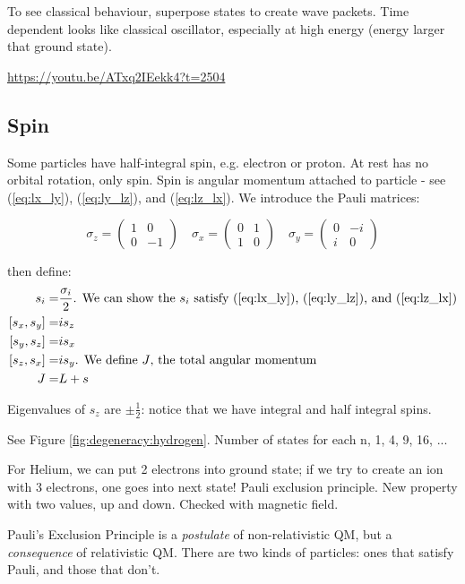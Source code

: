 \documentclass[]{article}
\begin{document}
To see classical behaviour, superpose states to create wave packets. Time dependent looks like classical oscillator, especially at high energy (energy larger that ground state).

\url{https://youtu.be/ATxq2IEekk4?t=2504}

\subsection{Spin}

Some particles have half-integral spin, e.g. electron or proton. At rest has no orbital rotation, only spin. Spin is angular momentum attached to particle - see (\ref{eq:lx_ly}), (\ref{eq:ly_lz}), and (\ref{eq:lz_lx}). We introduce the Pauli matrices:

$$
\sigma_z = \begin{pmatrix}
1 & 0 \\
0 & -1
\end{pmatrix}
\quad
\sigma_x = \begin{pmatrix}
0 & 1 \\
1 & 0
\end{pmatrix}
\quad
\sigma_y = \begin{pmatrix}
0 & -i \\
i & 0
\end{pmatrix}
$$

then define:
\begin{align*}
s_i =& \frac{\sigma_i}{2} \text{. We can show the $s_i$ satisfy (\ref{eq:lx_ly}), (\ref{eq:ly_lz}), and (\ref{eq:lz_lx})}\\
[s_x,s_y] =& i s_z \\
[s_y,s_z] =& i s_x\\
[s_z,s_x] =& i s_y \text{. We define $J$, the total angular momentum}\\
J=&L+s
\end{align*}

Eigenvalues of $s_z$ are $\pm \frac{1}{2}$: notice that we have integral and half integral spins.


See Figure \ref{fig:degeneracy:hydrogen}. Number of states for each n, 1, 4, 9, 16, ...

For Helium, we can put 2 electrons into ground state; if we try to create an ion with 3 electrons, one goes into next state! Pauli exclusion principle. New property with two values, up and down. Checked with magnetic field.

Pauli's Exclusion Principle is a\emph{ postulate} of non-relativistic QM, but a \emph{consequence} of relativistic QM. There are two kinds of particles: ones that satisfy Pauli, and those that don't.
\end{document}
